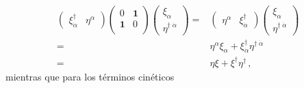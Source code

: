 \begin{align}
\label{eq:psidm}
  \begin{pmatrix}
  \xi^{\dagger}_{\dot{\alpha}}& \eta^{\alpha}
  \end{pmatrix}
  \begin{pmatrix}
    0           &\mathbf{1}\\
    \mathbf{1} &0\\
  \end{pmatrix} \begin{pmatrix}
   \xi_{\alpha}\\
   \eta^{\dagger\;\dot{\alpha}}    
  \end{pmatrix}
=&
\begin{pmatrix}
  \eta^{\alpha} & \xi^{\dagger}_{\dot{\alpha}}
\end{pmatrix}
\begin{pmatrix}
   \xi_{\alpha}\\
   \eta^{\dagger\;\dot{\alpha}}    
  \end{pmatrix}
\nonumber\\
=&\eta^{\alpha}\xi_{\alpha} +\xi^{\dagger}_{\dot{\alpha}}\eta^{\dagger\;\dot{\alpha}}\nonumber\\
=&\eta\xi+\xi^{\dagger}\eta^{\dagger}\,,
\end{align}
mientras que para los términos cinéticos
